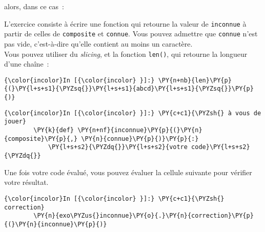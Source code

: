 \begin{Shaded}
\begin{Highlighting}[]
\OperatorTok{=} 
\OperatorTok{=} 
\end{Highlighting}
\end{Shaded}

alors, dans ce cas~:

\begin{Shaded}
\begin{Highlighting}[]
\OperatorTok{=} 
\end{Highlighting}
\end{Shaded}

    L'exercice consiste à écrire une fonction qui retourne la valeur de
\texttt{inconnue} à partir de celles de \texttt{composite} et
\texttt{connue}. Vous pouvez admettre que \texttt{connue} n'est pas
vide, c'est-à-dire qu'elle contient au moins un caractère.\\

    Vous pouvez utiliser du \emph{slicing}, et la fonction \texttt{len()},
qui retourne la longueur d'une chaîne~:

    \begin{Verbatim}[commandchars=\\\{\}]
{\color{incolor}In [{\color{incolor} }]:} \PY{n+nb}{len}\PY{p}{(}\PY{l+s+s1}{\PYZsq{}}\PY{l+s+s1}{abcd}\PY{l+s+s1}{\PYZsq{}}\PY{p}{)}
\end{Verbatim}


    \begin{Verbatim}[commandchars=\\\{\}]
{\color{incolor}In [{\color{incolor} }]:} \PY{c+c1}{\PYZsh{} à vous de jouer}
        \PY{k}{def} \PY{n+nf}{inconnue}\PY{p}{(}\PY{n}{composite}\PY{p}{,} \PY{n}{connue}\PY{p}{)}\PY{p}{:}
            \PY{l+s+s2}{\PYZdq{}}\PY{l+s+s2}{votre code}\PY{l+s+s2}{\PYZdq{}}
\end{Verbatim}


    Une fois votre code évalué, vous pouvez évaluer la cellule suivante pour
vérifier votre résultat.

    \begin{Verbatim}[commandchars=\\\{\}]
{\color{incolor}In [{\color{incolor} }]:} \PY{c+c1}{\PYZsh{} correction}
        \PY{n}{exo\PYZus{}inconnue}\PY{o}{.}\PY{n}{correction}\PY{p}{(}\PY{n}{inconnue}\PY{p}{)}
\end{Verbatim}


